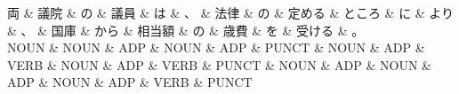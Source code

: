 \documentclass[tikz,border=5pt]{standalone}
\begin{document}
\normalsize
\begin{dependency}[edge unit distance=12.0pt]
    \begin{deptext}[column sep=1em]
        両 \& 議院 \& の \& 議員 \& は \& 、 \& 法律 \& の \& 定める \& ところ \& に \& より \& 、 \& 国庫 \& から \& 相当額 \& の \& 歳費 \& を \& 受ける \& 。\\
        NOUN \& NOUN \& ADP \& NOUN \& ADP \& PUNCT \& NOUN \& ADP \& VERB \& NOUN \& ADP \& VERB \& PUNCT \& NOUN \& ADP \& NOUN \& ADP \& NOUN \& ADP \& VERB \& PUNCT\\
    \end{deptext}
\end{dependency}
\end{document}
